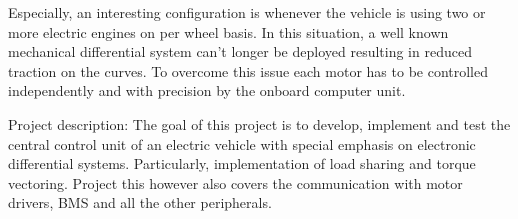 Especially, an interesting configuration is whenever the vehicle is using two or more electric engines on per wheel basis. In this situation, a well known mechanical differential system can't longer be deployed resulting in reduced traction on the curves. To overcome this issue each motor has to be controlled independently and with precision by the onboard computer unit.

Project description:     
The goal of this project is to develop, implement and test the central control unit of an electric vehicle with special emphasis on electronic differential systems. Particularly, implementation of load sharing and torque vectoring. Project this however also covers the communication with motor drivers, BMS and all the other peripherals.

